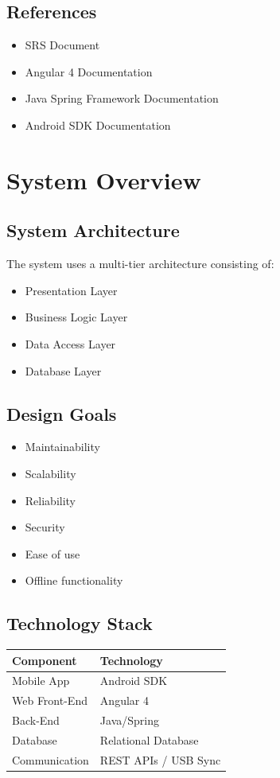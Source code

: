 \documentclass[12pt]{article}
\begin{document}
\subsection{References}

\begin{itemize}
\item SRS Document
\item Angular 4 Documentation
\item Java Spring Framework Documentation
\item Android SDK Documentation
\end{itemize}

\section{System Overview}

\subsection{System Architecture}

The system uses a multi-tier architecture consisting of:

\begin{itemize}
\item Presentation Layer
\item Business Logic Layer
\item Data Access Layer
\item Database Layer
\end{itemize}

\subsection{Design Goals}

\begin{itemize}
\item Maintainability
\item Scalability
\item Reliability
\item Security
\item Ease of use
\item Offline functionality
\end{itemize}

\subsection{Technology Stack}

\begin{longtable}{|p{4cm}|p{8cm}|}
\hline
Component & Technology \\ \hline
Mobile App & Android SDK \\ \hline
Web Front-End & Angular 4 \\ \hline
Back-End & Java/Spring \\ \hline
Database & Relational Database \\ \hline
Communication & REST APIs / USB Sync \\ \hline
\end{longtable}
\end{document}
